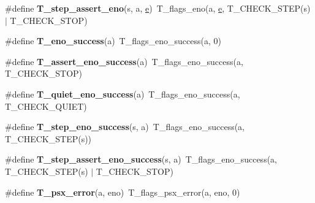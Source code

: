 \begin{DoxyCompactItemize}
\item 
\mbox{\label{group__RTEMSTestFrameworkChecksPSX_gaf6bf859e56452b90cc23bbddaf96f2a2}} 
\#define {\bfseries T\+\_\+step\+\_\+assert\+\_\+eno}(s,  a,  \mbox{\hyperlink{sun4u_2tte_8h_a8b0b9ed08e0e18920ec2682f48228c27}{e}})~T\+\_\+flags\+\_\+eno(a, \mbox{\hyperlink{sun4u_2tte_8h_a8b0b9ed08e0e18920ec2682f48228c27}{e}}, T\+\_\+\+C\+H\+E\+C\+K\+\_\+\+S\+T\+EP(s) $\vert$ T\+\_\+\+C\+H\+E\+C\+K\+\_\+\+S\+T\+OP)
\item 
\mbox{\label{group__RTEMSTestFrameworkChecksPSX_gaf7d0c92ef09faf6e619c716712e17333}} 
\#define {\bfseries T\+\_\+eno\+\_\+success}(a)~T\+\_\+flags\+\_\+eno\+\_\+success(a, 0)
\item 
\mbox{\label{group__RTEMSTestFrameworkChecksPSX_gaba5e1a3ba2e4e97eb633b7d9bfcd39bb}} 
\#define {\bfseries T\+\_\+assert\+\_\+eno\+\_\+success}(a)~T\+\_\+flags\+\_\+eno\+\_\+success(a, T\+\_\+\+C\+H\+E\+C\+K\+\_\+\+S\+T\+OP)
\item 
\mbox{\label{group__RTEMSTestFrameworkChecksPSX_ga6b22ea4ac4ef17ec3baed4564e43c2ea}} 
\#define {\bfseries T\+\_\+quiet\+\_\+eno\+\_\+success}(a)~T\+\_\+flags\+\_\+eno\+\_\+success(a, T\+\_\+\+C\+H\+E\+C\+K\+\_\+\+Q\+U\+I\+ET)
\item 
\mbox{\label{group__RTEMSTestFrameworkChecksPSX_ga8d32b5753d5505c1efc76260a026bb8e}} 
\#define {\bfseries T\+\_\+step\+\_\+eno\+\_\+success}(s,  a)~T\+\_\+flags\+\_\+eno\+\_\+success(a, T\+\_\+\+C\+H\+E\+C\+K\+\_\+\+S\+T\+EP(s))
\item 
\mbox{\label{group__RTEMSTestFrameworkChecksPSX_ga6254bcb150ef7b8adb14f202a8bba63a}} 
\#define {\bfseries T\+\_\+step\+\_\+assert\+\_\+eno\+\_\+success}(s,  a)~T\+\_\+flags\+\_\+eno\+\_\+success(a, T\+\_\+\+C\+H\+E\+C\+K\+\_\+\+S\+T\+EP(s) $\vert$ T\+\_\+\+C\+H\+E\+C\+K\+\_\+\+S\+T\+OP)
\item 
\mbox{\label{group__RTEMSTestFrameworkChecksPSX_ga8697418739bade3f42ce5fc94f5d26a6}} 
\#define {\bfseries T\+\_\+psx\+\_\+error}(a,  eno)~T\+\_\+flags\+\_\+psx\+\_\+error(a, eno, 0)

\end{DoxyCompactItemize}

